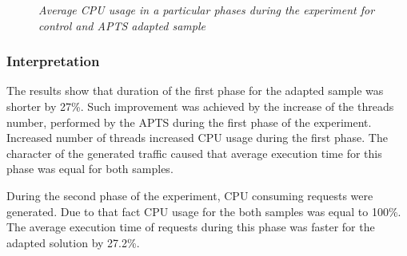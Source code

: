 \documentclass[12pt,a4paper]{article}
\begin{document}
\mydata
\begin{figure}[!htb]
\centering
{}
\caption{\textit{Average CPU usage in a particular phases during the experiment for control and APTS adapted sample}} \label{figure:threads:results:cpu}
\end{figure}


\subsubsection{Interpretation} 

The results show that duration of the first phase for the adapted sample was shorter by 27\%. Such improvement was achieved by the increase of the threads number, performed by the APTS during the first phase of the experiment. Increased number of threads increased CPU usage during the first phase. The character of the generated traffic caused that average execution time for this phase was equal for both samples. 

During the second phase of the experiment, CPU consuming requests were generated. Due to that fact CPU usage for the both samples was equal to 100\%. The average execution time of requests during this phase was faster for the adapted solution by 27.2\%. 
\end{document}

